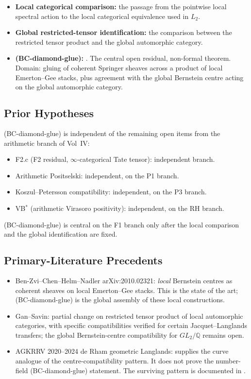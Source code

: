 \begin{itemize}
\item \textbf{Local categorical comparison:} the passage from the
pointwise local spectral action to the local categorical equivalence
used in \(L_{2}\).
\item \textbf{Global restricted-tensor identification:} the comparison
between the restricted tensor product and the global automorphic
category.
\item \textbf{(BC-diamond-glue):}
. The central open
residual, non-formal theorem. Domain: gluing of coherent Springer
sheaves across a product of local Emerton--Gee stacks, plus
agreement with the global Bernstein centre acting on the global
automorphic category.
\end{itemize}

\subsection{Prior Hypotheses}

(BC-diamond-glue) is independent of the remaining open items from
the arithmetic branch of Vol~IV:
\begin{itemize}
\item F2.c (F2 residual, \(\infty\)-categorical Tate tensor): independent branch.
\item Arithmetic Positselski: independent, on the P1 branch.
\item Koszul--Petersson compatibility: independent, on the P3 branch.
\item VB\(^{*}\) (arithmetic Virasoro positivity): independent, on the
RH branch.
\end{itemize}

(BC-diamond-glue) is central on the F1 branch only after the local
comparison and the global identification are fixed.

\subsection{Primary-Literature Precedents}

\begin{itemize}
\item Ben-Zvi--Chen--Helm--Nadler arXiv:2010.02321: \emph{local}
Bernstein centres as coherent sheaves on local Emerton--Gee stacks.
This is the state of the art; (BC-diamond-glue) is the global
assembly of these local constructions.
\item Gan--Savin: partial change on restricted
tensor product of local automorphic categories, with specific
compatibilities verified for certain Jacquet--Langlands transfers;
the global Bernstein-centre compatibility for \(GL_{2}/\mathbb{Q}\)
remains open.
\item AGKRRV 2020--2024 de Rham geometric Langlands: supplies the
curve analogue of the centre-compatibility pattern.  It does not prove
the number-field (BC-diamond-glue) statement. The surviving pattern is
documented in
.
\end{itemize}


